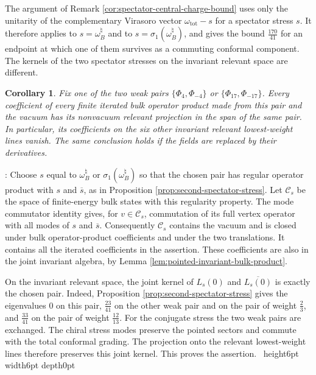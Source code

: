 \documentclass[leqno]{article}
\newcommand{\qed}{\hfill \vrule height6pt  width6pt depth0pt}
\newtheorem{cor}[thm]{Corollary}
\newenvironment{proof}[1][]{\noindent {\it Proof #1} : }{\hbox{~}\qed
\smallskip
}
\numberwithin{equation}{section}
\begin{document}
The argument of Remark \ref{cor:spectator-central-charge-bound} uses only the unitarity of the complementary Virasoro vector $\omega_{\mathrm{tot}}-s$ for a spectator stress $s$. It therefore applies to $s = \omega_B^\natural$ and to $s = \sigma_1(\omega_B^\natural)$, and gives the bound $\frac{170}{41}$ for an endpoint at which one of them survives as a commuting conformal component. The kernels of the two spectator stresses on the invariant relevant space are different.


\begin{cor}
\label{cor:single-weak-pair-selection}
Fix one of the two weak pairs $\{\Phi_4,\Phi_{-4}\}$ or $\{\Phi_{17},\Phi_{-17}\}$. Every coefficient of every finite iterated bulk operator product made from this pair and the vacuum has its nonvacuum relevant projection in the span of the same pair. In particular, its coefficients on the six other invariant relevant lowest-weight lines vanish. The same conclusion holds if the fields are replaced by their derivatives.
\end{cor}

\begin{proof}
Choose $s$ equal to $\omega_B^\natural$ or $\sigma_1(\omega_B^\natural)$ so that the chosen pair has regular operator product with $s$ and $\overline s$, as in Proposition \ref{prop:second-spectator-stress}. Let $\mathscr C_s$ be the space of finite-energy bulk states with this regularity property. The mode commutator identity gives, for $v \in \mathscr C_s$, commutation of its full vertex operator with all modes of $s$ and $\overline s$. Consequently $\mathscr C_s$ contains the vacuum and is closed under bulk operator-product coefficients and under the two translations. It contains all the iterated coefficients in the assertion. These coefficients are also in the joint invariant algebra, by Lemma \ref{lem:pointed-invariant-bulk-product}.

On the invariant relevant space, the joint kernel of $L_s(0)$ and $\overline{L_s(0)}$ is exactly the chosen pair. Indeed, Proposition \ref{prop:second-spectator-stress} gives the eigenvalues $0$ on this pair, $\frac{23}{41}$ on the other weak pair and on the pair of weight $\frac23$, and $\frac{33}{41}$ on the pair of weight $\frac{12}{13}$. For the conjugate stress the two weak pairs are exchanged. The chiral stress modes preserve the pointed sectors and commute with the total conformal grading. The projection onto the relevant lowest-weight lines therefore preserves this joint kernel. This proves the assertion.
\end{proof}
\end{document}
